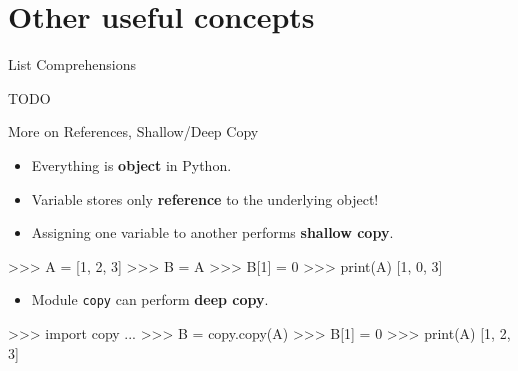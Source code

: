 \documentclass[10pt]{beamer}
\begin{document}
\section{Other useful concepts}


\begin{frame}[fragile]{List Comprehensions}

    TODO

\end{frame}

\begin{frame}[fragile]{More on References, Shallow/Deep Copy}

    \begin{itemize}
        \item \pause Everything is \textbf{object} in Python.
        \item \pause Variable stores only \textbf{reference} to the underlying object!
        \item \pause Assigning one variable to another performs \textbf{shallow copy}.
    \end{itemize}

    \pause
    \begin{pythoncode}
        >>> A = [1, 2, 3]
        >>> B = A
        >>> B[1] = 0
        >>> print(A)
        [1, 0, 3]
    \end{pythoncode}

    \begin{itemize}
        \item \pause Module \small{\texttt{copy}} can perform \textbf{deep copy}.
    \end{itemize}
    \begin{pythoncode}
        >>> import copy
        ...
        >>> B = copy.copy(A)
        >>> B[1] = 0
        >>> print(A)
        [1, 2, 3]
    \end{pythoncode}
\end{frame}

\end{document}
